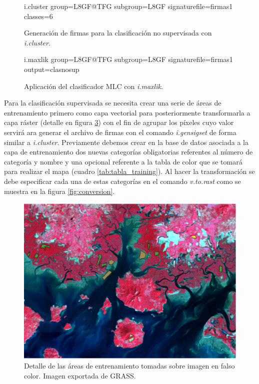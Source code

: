 \begin{figure}[ht]
	\centering
	\begin{boxedverbatim}
	i.cluster group=L8GF@TFG subgroup=L8GF
	signaturefile=firmas1 classes=6
	\end{boxedverbatim}
	\caption[Generación de firmas \textit{i.cluster}]{Generación de firmas para la clasificación no supervisada con \textit{i.cluster}.}
	\label{fig:cluster}
\end{figure}

\begin{figure}[ht]
	\centering
	\begin{boxedverbatim}
	i.maxlik group=L8GF@TFG subgroup=L8GF
	signaturefile=firmas1 output=clasnosup
	\end{boxedverbatim}
	\caption[Clasificación con \textit{i.maxlik}]{Aplicación del clasificador \ac{MLC} con \textit{i.maxlik}.}
	\label{fig:maxlik}
\end{figure}

Para la clasificación supervisada se necesita crear una serie de áreas de entrenamiento primero como capa vectorial para posteriormente transformarla a capa ráster (detalle en figura \ref{fig:detalle_training}) con el fin de agrupar los píxeles cuyo valor servirá ara generar el archivo de firmas con el comando \textit{i.gensigset} de forma similar a \textit{i.cluster}. Previamente debemos crear en la base de datos asociada a la capa de entrenamiento dos nuevas categorías obligatorias referentes al número de categoría y nombre y una opcional referente a la tabla de color que se tomará para realizar el mapa (cuadro \ref{tab:tabla_training}). Al hacer la transformación se debe especificar cada una de estas categorías en el comando \textit{v.to.rast} como se muestra en la figura \ref{fig:conversion}.%

\begin{figure}
	\centering
	\includegraphics[width=0.9\linewidth]{./Imagenes/Detalle_training.eps}
	\caption[Detalle de áreas de entrenamiento]{Detalle de las áreas de entrenamiento tomadas sobre imagen en falso color. Imagen exportada de GRASS.}
	\label{fig:detalle_training}
\end{figure}


